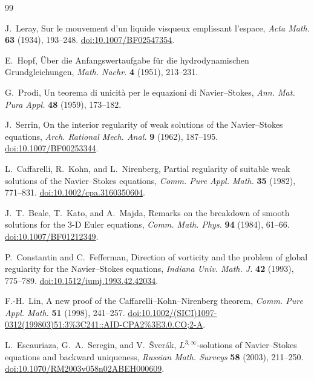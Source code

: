 \documentclass[11pt]{article}
\begin{document}
\begin{thebibliography}{99}

J.~Leray,
Sur le mouvement d'un liquide visqueux emplissant l'espace,
\emph{Acta Math.} \textbf{63} (1934), 193--248.
\href{https://doi.org/10.1007/BF02547354}{doi:10.1007/BF02547354}.

E.~Hopf,
\"Uber die Anfangswertaufgabe f\"ur die hydrodynamischen Grundgleichungen,
\emph{Math. Nachr.} \textbf{4} (1951), 213--231.

G.~Prodi,
Un teorema di unicit\`a per le equazioni di Navier--Stokes,
\emph{Ann. Mat. Pura Appl.} \textbf{48} (1959), 173--182.

J.~Serrin,
On the interior regularity of weak solutions of the Navier--Stokes equations,
\emph{Arch. Rational Mech. Anal.} \textbf{9} (1962), 187--195.
\href{https://doi.org/10.1007/BF00253344}{doi:10.1007/BF00253344}.

L.~Caffarelli, R.~Kohn, and L.~Nirenberg,
Partial regularity of suitable weak solutions of the Navier--Stokes equations,
\emph{Comm. Pure Appl. Math.} \textbf{35} (1982), 771--831.
\href{https://doi.org/10.1002/cpa.3160350604}{doi:10.1002/cpa.3160350604}.

J.~T.~Beale, T.~Kato, and A.~Majda,
Remarks on the breakdown of smooth solutions for the 3-D Euler equations,
\emph{Comm. Math. Phys.} \textbf{94} (1984), 61--66.
\href{https://doi.org/10.1007/BF01212349}{doi:10.1007/BF01212349}.

P.~Constantin and C.~Fefferman,
Direction of vorticity and the problem of global regularity for the
Navier--Stokes equations,
\emph{Indiana Univ. Math. J.} \textbf{42} (1993), 775--789.
\href{https://doi.org/10.1512/iumj.1993.42.42034}{doi:10.1512/iumj.1993.42.42034}.

F.-H.~Lin,
A new proof of the Caffarelli--Kohn--Nirenberg theorem,
\emph{Comm. Pure Appl. Math.} \textbf{51} (1998), 241--257.
\href{https://doi.org/10.1002/(SICI)1097-0312(199803)51:3\%3C241::AID-CPA2\%3E3.0.CO;2-A}{doi:10.1002/(SICI)1097-0312(199803)51:3\%3C241::AID-CPA2\%3E3.0.CO;2-A}.

L.~Escauriaza, G.~A.~Seregin, and V.~\v{S}ver\'ak,
\(L^{3,\infty}\)-solutions of Navier--Stokes equations and backward uniqueness,
\emph{Russian Math. Surveys} \textbf{58} (2003), 211--250.
\href{https://doi.org/10.1070/RM2003v058n02ABEH000609}{doi:10.1070/RM2003v058n02ABEH000609}.


\end{thebibliography}
\end{document}
